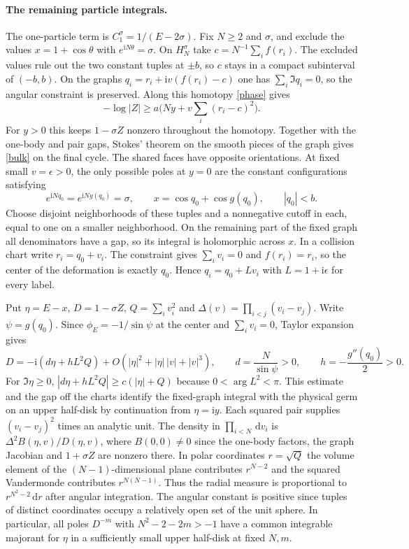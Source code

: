 \documentclass[11pt]{article}
\newcommand{\ii}{\mathrm i}
\newcommand{\dd}{\,\mathrm d}
\begin{document}
\paragraph{The remaining particle integrals.}
The one-particle term is $C_1^\sigma=1/(E-2\sigma)$.
Fix $N\ge2$ and $\sigma$, and exclude the values $x=1+\cos\theta$ with
$e^{\ii N\theta}=\sigma$. On $H_N^\sigma$ take
$c=N^{-1}\sum_i f(r_i)$. The excluded values rule out the two constant
tuples at $\pm b$, so $c$ stays in a compact subinterval of $(-b,b)$.
On the graphs
$q_i=r_i+\ii v(f(r_i)-c)$ one has $\sum_i\Im q_i=0$, so the
angular constraint is preserved.
Along this homotopy \eqref{phase} gives
\[
 -\log |Z|\ge a\bigl(Ny+v\textstyle\sum_i(r_i-c)^2\bigr).
\]
For $y>0$ this keeps $1-\sigma Z$ nonzero throughout the homotopy.
Together with the one-body and pair gaps, Stokes' theorem on the
smooth pieces of the graph gives \eqref{bulk} on the final cycle.
The shared faces have opposite orientations.
At fixed small $v=\epsilon>0$, the only possible poles at $y=0$ are
the constant configurations satisfying
\begin{equation}\label{res}
 e^{\ii N q_0}=e^{\ii N g(q_0)}=\sigma,\qquad
 x=\cos q_0+\cos g(q_0),\qquad |q_0|<b .
\end{equation}
Choose disjoint neighborhoods of these tuples and a nonnegative cutoff
in each, equal to one on a smaller neighborhood. On the remaining
part of the fixed graph all denominators have a gap, so its integral
is holomorphic across $x$. In a collision chart write $r_i=q_0+v_i$. The
constraint gives $\sum_i v_i=0$ and $f(r_i)=r_i$, so the center
of the deformation is exactly $q_0$. Hence $q_i=q_0+L v_i$ with
$L=1+\ii\epsilon$ for every label.

Put $\eta=E-x$, $D=1-\sigma Z$, $Q=\sum_i v_i^2$ and
$\Delta(v)=\prod_{i<j}(v_i-v_j)$. Write $\psi=g(q_0)$.
Since $\phi_E=-1/\sin\psi$ at the center and $\sum_i v_i=0$,
Taylor expansion gives
\begin{equation}\label{expansion}
 D=-\ii(d\eta+hL^2 Q)+O(|\eta|^2+|\eta|\,|v|+|v|^3),\qquad
 d=\frac{N}{\sin\psi}>0,\qquad h=-\frac{g''(q_0)}2>0 .
\end{equation}
For $\Im\eta\ge0$, $|d\eta+hL^2Q|\ge c(|\eta|+Q)$ because
$0<\arg L^2<\pi$. This estimate and the gap off the charts identify
the fixed-graph integral with the physical germ on an upper half-disk
by continuation from $\eta=\ii y$. Each squared pair supplies
$(v_i-v_j)^2$ times an analytic unit. The density in
$\prod_{i<N}\dd v_i$ is $\Delta^2 B(\eta,v)/D(\eta,v)$, where
$B(0,0)\ne0$ since the one-body factors, the graph Jacobian and
$1+\sigma Z$ are nonzero there. In polar coordinates $r=\sqrt Q$
the volume element of the $(N-1)$-dimensional plane contributes
$r^{N-2}$ and the squared Vandermonde contributes $r^{N(N-1)}$.
Thus the radial measure is proportional to $r^{N^2-2}\dd r$ after
angular integration. The angular constant is positive since tuples
of distinct coordinates occupy a relatively open set of the unit
sphere. In particular, all poles $D^{-m}$ with
$N^2-2-2m>-1$ have a common integrable majorant for $\eta$ in a
sufficiently small upper half-disk at fixed $N,m$.
\end{document}
